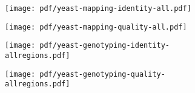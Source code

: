 \documentclass{article}
\begin{document}
\clearpage
\begin{figure}
  \begin{subfigure}[b]{.5\textwidth}
    \caption{}
    \texttt{[image: pdf/yeast-mapping-identity-all.pdf]}
  \end{subfigure}
  \begin{subfigure}[b]{.5\textwidth}
    \caption{}
    \texttt{[image: pdf/yeast-mapping-quality-all.pdf]}
  \end{subfigure}
\end{figure}

\clearpage
\begin{figure}
  \begin{subfigure}[b]{.6\textwidth}
    \caption{}
    \texttt{[image: pdf/yeast-genotyping-identity-allregions.pdf]}
  \end{subfigure}
  \begin{subfigure}[b]{.4\textwidth}
    \caption{}
    \texttt{[image: pdf/yeast-genotyping-quality-allregions.pdf]}
  \end{subfigure}
\end{figure}

\end{document}
